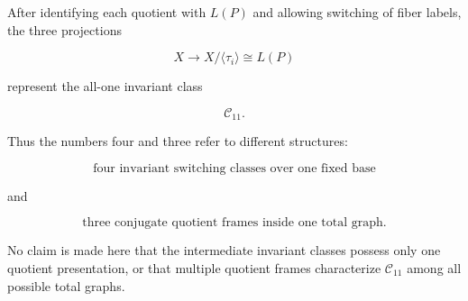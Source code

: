 After identifying each quotient with \(L(P)\) and allowing switching of
fiber labels, the three projections

\[
X\longrightarrow X/\langle\tau_i\rangle\cong L(P)
\]

represent the all-one invariant class

\[
\mathcal C_{11}.
\]

Thus the numbers four and three refer to different structures:

\[
\boxed{
\text{four invariant switching classes over one fixed base}
}
\]

and

\[
\boxed{
\text{three conjugate quotient frames inside one total graph}.
}
\]

No claim is made here that the intermediate invariant classes possess only
one quotient presentation, or that multiple quotient frames characterize
\(\mathcal C_{11}\) among all possible total graphs.
